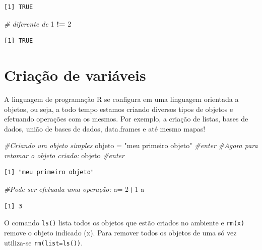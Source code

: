 \documentclass[12pt,brazil,oneside]{book}
\newenvironment{Shaded}{\begin{snugshade}}{\end{snugshade}}
\newcommand{\CommentTok}[1]{\textcolor[rgb]{0.56,0.35,0.01}{\textit{#1}}}
\newcommand{\DecValTok}[1]{\textcolor[rgb]{0.00,0.00,0.81}{#1}}
\newcommand{\NormalTok}[1]{#1}
\newcommand{\OperatorTok}[1]{\textcolor[rgb]{0.81,0.36,0.00}{\textbf{#1}}}
\newcommand{\StringTok}[1]{\textcolor[rgb]{0.31,0.60,0.02}{#1}}
\begin{document}
\begin{verbatim}
[1] TRUE
\end{verbatim}

\begin{Shaded}
\begin{Highlighting}[]
\CommentTok{# diferente de}
\DecValTok{1} \OperatorTok{!=}\StringTok{ }\DecValTok{2}
\end{Highlighting}
\end{Shaded}

\begin{verbatim}
[1] TRUE
\end{verbatim}

\hypertarget{criacao-de-variaveis}{%
\section{Criação de variáveis}\label{criacao-de-variaveis}}

A linguagem de programação R se configura em uma linguagem orientada a
objetos, ou seja, a todo tempo estamos criando diversos tipos de objetos
e efetuando operações com os mesmos. Por exemplo, a criação de listas,
bases de dados, união de bases de dados, data.frames e até mesmo mapas!

\begin{Shaded}
\begin{Highlighting}[]
\CommentTok{#Criando um objeto simples}
\NormalTok{objeto =}\StringTok{ "meu primeiro objeto"} \CommentTok{#enter}
\CommentTok{#Agora para retomar o objeto criado:}
\NormalTok{objeto }\CommentTok{#enter}
\end{Highlighting}
\end{Shaded}

\begin{verbatim}
[1] "meu primeiro objeto"
\end{verbatim}

\begin{Shaded}
\begin{Highlighting}[]
\CommentTok{#Pode ser efetuada uma operação:}
\NormalTok{a=}\StringTok{ }\DecValTok{2}\OperatorTok{+}\DecValTok{1}
\NormalTok{a}
\end{Highlighting}
\end{Shaded}

\begin{verbatim}
[1] 3
\end{verbatim}

O comando \texttt{ls()} lista todos os objetos que estão criados no
ambiente e \texttt{rm(x)} remove o objeto indicado (x). Para remover
todos os objetos de uma só vez utiliza-se \texttt{rm(list=ls())}.
\end{document}
